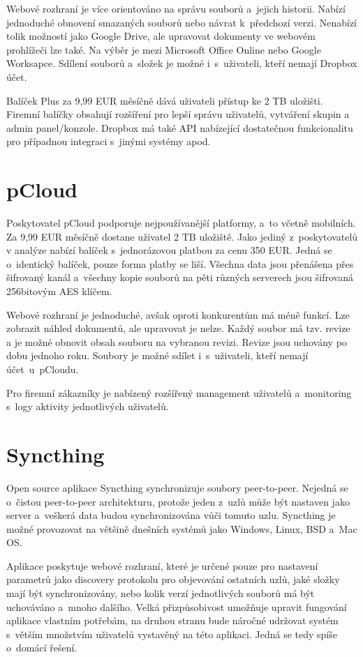 Webové rozhraní je více orientováno na správu souborů a jejich historii. Nabízí jednoduché obnovení smazaných souborů nebo návrat k předchozí verzi.
Nenabízí tolik možností jako Google Drive, ale upravovat dokumenty ve webovém prohlížeči lze také. Na výběr je mezi Microsoft Office Online nebo Google Worksapce.
Sdílení souborů a složek je možné i s uživateli, kteří nemají Dropbox účet.

Balíček Plus za 9,99 EUR měsíčně dává uživateli přístup ke 2 TB uložišti. Firemní balíčky obsahují rozšíření pro lepší správu uživatelů, vytváření skupin
a admin panel/konzole. Dropbox má také API nabízející dostatečnou funkcionalitu pro případnou integraci s jinými systémy apod. \cite{Dropbox}

\section{pCloud}

Poskytovatel pCloud podporuje nejpoužívanější platformy, a to včetně mobilních. Za 9,99 EUR měsíčně dostane uživatel 2 TB uložiště. Jako jediný z poskytovatelů
v analýze nabízí balíček s jednorázovou platbou za cenu 350 EUR. Jedná se o identický balíček, pouze forma platby se liší. Všechna data jsou přenášena přes
šifrovaný kanál a všechny kopie souborů na pěti různých serverech jsou šifrovaná 256bitovým AES klíčem. \cite{pCloud}

Webové rozhraní je jednoduché, avšak oproti konkurentům má méně funkcí. Lze zobrazit náhled dokumentů, ale upravovat je nelze. Každý soubor má tzv. revize 
a je možné obnovit obsah souboru na vybranou revizi. Revize jsou uchovány po dobu jednoho roku. Soubory je možné sdílet i s uživateli, kteří nemají účet u pCloudu. 

Pro firemní zákazníky je nabízený rozšířený management uživatelů a monitoring s logy aktivity jednotlivých uživatelů.

\section{Syncthing}

Open source aplikace Syncthing synchronizuje soubory peer-to-peer. Nejedná se o čistou peer-to-peer architekturu, protože jeden z uzlů může být
nastaven jako server a veškerá data budou synchronizována vůči tomuto uzlu. Syncthing je možné provozovat na většině dnešních systémů jako Windows, Linux, BSD a Mac OS. \cite{Syncthing}

Aplikace poskytuje webové rozhraní, které je určené pouze pro nastavení parametrů jako discovery protokolu pro objevování ostatních uzlů, jaké složky mají být synchronizovány,
nebo kolik verzí jednotlivých souborů má být uchováváno a mnoho dalšího. Velká přizpůsobivost umožňuje upravit fungování aplikace vlastním potřebám, na druhou
stranu bude náročné udržovat systém s větším množstvím uživatelů vystavěný na této aplikaci. Jedná se tedy spíše o domácí řešení.

